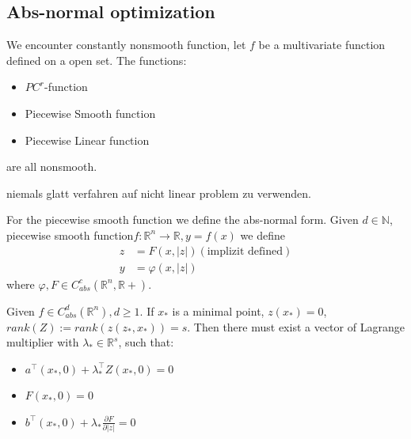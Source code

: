 \begin{example}
\end{example}

\subsection{Abs-normal optimization}
We encounter constantly nonsmooth function, let $f$ be a multivariate function defined on a open set. The functions:
	\begin{itemize}
	\item $PC^r$-function
	\item Piecewise Smooth function
	\item Piecewise Linear function
\end{itemize} 
are all nonsmooth. 


\begin{example}
	niemals glatt verfahren auf nicht linear problem zu verwenden. 
\end{example}

\begin{definition}
	For the piecewise smooth function we define the abs-normal form. Given $d \in \mathbb{N}$, piecewise smooth function$ f: \mathbb{R}^n \longrightarrow \mathbb{R}, y = f(x)$ we define 
	\begin{align*}
			z &= F(x, |z|) (\text{implizit defined})\\
			y &= \varphi(x, |z|)
	\end{align*}
	where $\varphi, F \in C_{abs}^c(\mathbb{R}^n, \mathbb{R}+)$.
\end{definition}

\begin{example}
\end{example}

\begin{theorem}
	Given $f \in C_{abs}^d(\mathbb{R}^n), d \geq 1$. If $x_*$ is a minimal point, $z(x_*) = 0$, $rank(Z) := rank(z(z_*, x_*)) = s$. Then there must exist a vector of Lagrange multiplier with $\lambda_* \in \mathbb{R}^s$, such that:
	\begin{itemize}
		\item $a^\top (x_*, 0) + \lambda_*^\top Z(x_*, 0) = 0$  
		\item $F(x_*, 0) = 0$
		\item $b^\top (x_*, 0) + \lambda_* \frac{\partial F}{\partial |z|} = 0$
	\end{itemize}
\end{theorem}


